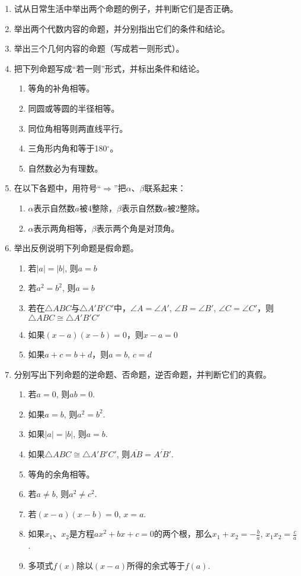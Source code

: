 \begin{ex}
	\begin{enumerate}
		\item 试从日常生活中举出两个命题的例子，并判断它们是否正确。
		\item 举出两个代数内容的命题，并分别指出它们的条件和结论。
		\item 举出三个几何内容的命题（写成若一则形式）。
		\item 把下列命题写成“若一则”形式，并标出条件和结论。
		\begin{enumerate}
			\item 等角的补角相等。
			\item 同圆或等圆的半径相等。
			\item 同位角相等则两直线平行。
			\item 三角形内角和等于180$^{\circ}$。
			\item 自然数必为有理数。
		\end{enumerate}
		\item 在以下各题中，用符号“$\Rightarrow$”把$\alpha$、$\beta$联系起来：
		\begin{enumerate}
			\item $\alpha$表示自然数$a$被4整除，$\beta$表示自然数$a$被2整除。
			\item $\alpha$表示两角相等，$\beta$表示两个角是对顶角。
		\end{enumerate}
		\item 举出反例说明下列命题是假命题。
		\begin{enumerate}
			\item 若$|a|=|b|$, 则$a=b$
			\item 若$a^2=b^2$, 则$a=b$
			\item 若在$\triangle ABC$与$\triangle A'B'C'$中，$\angle A=\angle A'$, $\angle B=\angle B'$, $\angle C=\angle C'$，则$\triangle ABC\cong \triangle A'B'C'$
			\item 如果$(x-a)(x-b)=0$，则$x-a=0$
			\item 如果$a+c=b+d$，则$a=b$, $c=d$
		\end{enumerate}
		\item 分别写出下列命题的逆命题、否命题，逆否命题，并判断它们的真假。
		\begin{enumerate}
			\item 若$a=0$, 则$ab=0$.
			\item 如果$a=b$, 则$a^2=b^2$.
			\item 如果$|a|=|b|$, 则$a=b$.
			\item 如果$\triangle ABC\cong \triangle A'B'C'$, 则$\overline{AB}=\overline{A'B'}$.
			\item 等角的余角相等。
			\item 若$a\ne b$, 则$a^2\ne c^2$.
			\item 若$(x-a)(x-b)=0$, $x=a$.
			\item 如果$x_1$、$x_2$是方程$ax^2+bx+c=0$的两个根，那么$x_1+x_2=-\frac{b}{a}$, $x_1x_2=\frac{c}{a}$.
			\item 多项式$f(x)$除以$(x-a)$所得的余式等于$f(a)$.
		\end{enumerate}
	\end{enumerate}
\end{ex}

